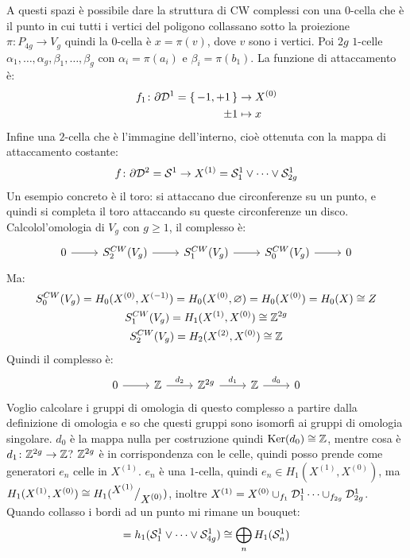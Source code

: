 A questi spazi è possibile dare la struttura di CW complessi
con una $ 0 $-cella che è il punto in cui tutti i vertici del
poligono collassano sotto la proiezione $ \pi \colon P_{4g} \to V_g $
quindi la $ 0 $-cella è $ x = \pi(v) $, dove $ v $ sono i vertici.
Poi $ 2 g $ $ 1 $-celle $ \alpha_1, \dots, \alpha_g, \beta_1, \dots, \beta_g $ con
$ \alpha_i = \pi(a_i) $ e $ \beta_i = \pi(b_1) $. La funzione di attaccamento
è:
\begin{align*}
  f_1 \colon \partial \mathcal{D}^{1} = \set{-1, +1} & \to X^{(0)} \\
  \pm 1 & \mapsto x
\end{align*}
Infine una $ 2 $-cella
che è l'immagine dell'interno, cioè ottenuta con la mappa
di attaccamento costante:
\[
  f \colon \partial \mathcal{D}^{2} = \mathcal{S}^{1} \to X^{(1)} = \mathcal{S}^{1}_1 \vee \dots \vee \mathcal{S}^{1}_{2g}
\]
Un esempio concreto è il toro: si attaccano due circonferenze su un punto, e
quindi si completa il toro attaccando su queste circonferenze un disco. \\
Calcolol'omologia di $ V_g $ con $ g \geq 1 $, il complesso è:
\[
  \begin{tikzcd}
    0 \rar & S^{CW}_2(V_g) \rar & S^{CW}_1(V_g) \rar & S^{CW}_0(V_g) \rar & 0
  \end{tikzcd}
\]
Ma:
\begin{gather*}
  S^{CW}_0(V_g) = H_0(X^{(0)}, X^{(-1)}) = H_0(X^{(0)}, \varnothing) = H_0(X^{(0)}) = H_0(X) \cong Z \\
  S^{CW}_1(V_g) = H_1(X^{(1)}, X^{(0)}) \cong \mathbb{Z}^{2g} \\
  S^{CW}_2(V_g) = H_2(X^{(2)}, X^{(0)}) \cong \mathbb{Z}
\end{gather*}
Quindi il complesso è:
\[
  \begin{tikzcd}
    0 \rar & \Z \rar{d_2} & \Z^{2g} \rar{d_1} & \Z \rar{d_0} & 0
  \end{tikzcd}
\]
Voglio calcolare i gruppi di omologia di questo complesso a partire dalla
definizione di omologia e so che questi gruppi sono isomorfi ai gruppi di
omologia singolare. $ d_0 $ è la mappa nulla per costruzione quindi
$ \mathrm{Ker}( d_0) \cong \mathbb{Z} $, mentre cosa è $ d_1 \colon \mathbb{Z}^{2g} \to \mathbb{Z} $? $ \mathbb{Z}^{2g} $ è in
corrispondenza con le celle, quindi posso prende come generatori $ e_n $ celle
in $ X^{(1)} $. $ e_n $ è una $ 1 $-cella, quindi
$ e_n \in H_1(X^{(1)}, X^{(0)}) $, ma
$ H_1(X^{(1)}, X^{(0)}) \cong H_1({^{\textstyle X^{(1)}}\big/_{\textstyle X^{(0)}}}) $, inoltre
$ X^{(1)} = X^{(0)} \cup_{f_1} \mathcal{D}^{1}_1 \dots \cup_{f_{2g}} \mathcal{D}^{1}_{2g} $. Quando
collasso i bordi ad un punto mi rimane un bouquet:
\[
  = h_1(\mathcal{S}^{1}_1 \vee \dots \vee \mathcal{S}^{1}_{4g}) \cong \bigoplus_n H_1(\mathcal{S}^{1}_n)
\]
